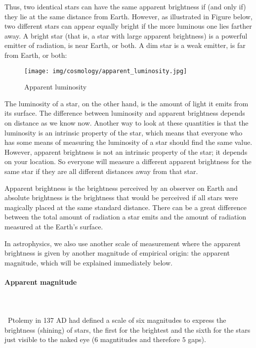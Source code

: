	Thus, two identical stars can have the same apparent brightness if (and only if) they lie at the same distance from Earth. However, as illustrated in Figure below, two different stars can appear equally bright if the more luminous one lies farther away. A bright star (that is, a star with large apparent brightness) is a powerful emitter of radiation, is near Earth, or both. A dim star is a weak emitter, is far from Earth, or both:
	\begin{figure}[H]
		\begin{center}
			\texttt{[image: img/cosmology/apparent\_luminosity.jpg]}
		\end{center}	
		\caption{Apparent luminosity}
	\end{figure}	
	 The luminosity of a star, on the other hand, is the amount of light it emits from its surface. The difference between luminosity and apparent brightness depends on distance as we know now. Another way to look at these quantities is that the luminosity is an intrinsic property of the star, which means that everyone who has some means of measuring the luminosity of a star should find the same value. However, apparent brightness is not an intrinsic property of the star; it depends on your location. So everyone will measure a different apparent brightness for the same star if they are all different distances away from that star.
	
	Apparent brightness is the brightness perceived by an observer on Earth and absolute brightness is the brightness that would be perceived if all stars were magically placed at the same standard distance. There can be a great difference between the total amount of radiation a star emits and the amount of radiation measured at the Earth's surface.
	
	In astrophysics, we also use another scale of measurement where the apparent brightness is given by another magnitude of empirical origin: the apparent magnitude, which will be explained immediately below.
	
	\paragraph{Apparent magnitude}\mbox{}\\\\\
	Ptolemy in 137 AD had defined a scale of six magnitudes to express the brightness (shining) of stars, the first for the brightest and the sixth for the stars just visible to the naked eye ($6$ magntitudes and therefore $5$ gaps).


